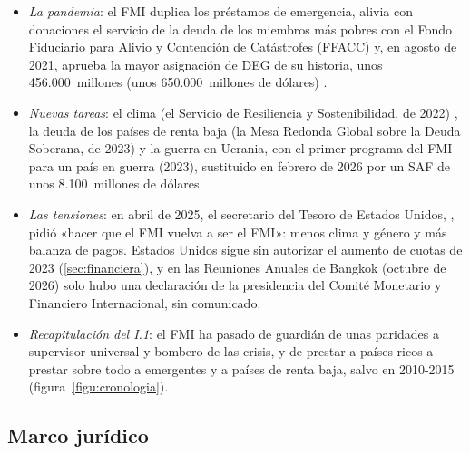 \documentclass[11pt]{article}
\begin{document}
\begin{itemize}
\item \emph{La pandemia}: el FMI duplica los préstamos de emergencia, alivia con donaciones el servicio de la deuda de los miembros más pobres con el Fondo Fiduciario para Alivio y Contención de Catástrofes (FFACC) y, en agosto de 2021, aprueba la mayor asignación de DEG de su historia, unos 456.000~millones (unos 650.000~millones de dólares)\nocite{FMI2026InformeAnual} .
\item \emph{Nuevas tareas}: el clima (el Servicio de Resiliencia y Sostenibilidad, de 2022) , la deuda de los países de renta baja (la Mesa Redonda Global sobre la Deuda Soberana, de 2023) y la guerra en Ucrania, con el primer programa del FMI para un país en guerra (2023), sustituido en febrero de 2026 por un SAF de unos 8.100~millones de dólares\nocite{FMI2026Ucrania}\nocite{FMI2023GSDR}.
\item \emph{Las tensiones}: en abril de 2025, el secretario del Tesoro de Estados Unidos, , pidió «hacer que el FMI vuelva a ser el FMI»: menos clima y género y más balanza de pagos\nocite{Bessent2025IIF}. Estados Unidos sigue sin autorizar el aumento de cuotas de 2023 (\ref{sec:financiera}), y en las Reuniones Anuales de Bangkok (octubre de 2026) solo hubo una declaración de la presidencia del Comité Monetario y Financiero Internacional, sin comunicado\nocite{CMFI2026Bangkok}.
\end{itemize}

\begin{itemize}
\item \emph{Recapitulación del I.1}: el FMI ha pasado de guardián de unas paridades a supervisor universal y bombero de las crisis, y de prestar a países ricos a prestar sobre todo a emergentes y a países de renta baja, salvo en 2010-2015 (figura~\ref{figu:cronologia}).
\end{itemize}

\begin{infografia}[H]
\centering
\caption{El FMI en 4~etapas, 1944-2026}\label{figu:cronologia}
\end{infografia}


\subsection{Marco jurídico}\label{sec:juridico}
\end{document}
